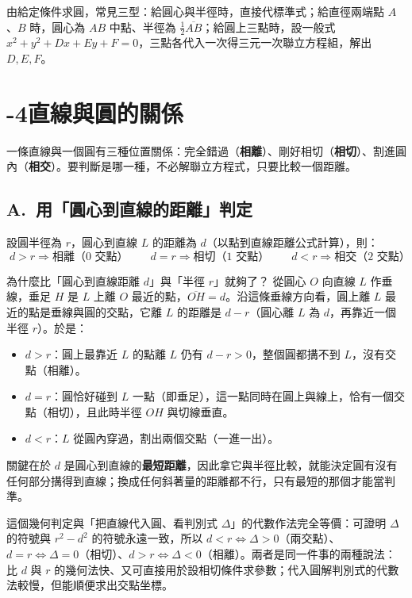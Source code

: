 \documentclass[11pt]{article}
\begin{document}
由給定條件求圓，常見三型：給圓心與半徑時，直接代標準式；給直徑兩端點 $A$、$B$ 時，圓心為 $AB$ 中點、半徑為 $\tfrac12\overline{AB}$；給圓上三點時，設一般式 $x^2+y^2+Dx+Ey+F=0$，三點各代入一次得三元一次聯立方程組，解出 $D,E,F$。

\section*{-4\quad 直線與圓的關係}

一條直線與一個圓有三種位置關係：完全錯過（\textbf{相離}）、剛好相切（\textbf{相切}）、割進圓內（\textbf{相交}）。要判斷是哪一種，不必解聯立方程式，只要比較一個距離。

\subsection*{\sffamily A.\ 用「圓心到直線的距離」判定}

設圓半徑為 $r$，圓心到直線 $L$ 的距離為 $d$（以點到直線距離公式計算），則：
$$\boxed{\;d>r\Rightarrow\text{相離（0 交點）}\qquad d=r\Rightarrow\text{相切（1 交點）}\qquad d<r\Rightarrow\text{相交（2 交點）}\;}$$


\begin{補充框}{為什麼比「圓心到直線距離 $d$」與「半徑 $r$」就夠了？}
從圓心 $O$ 向直線 $L$ 作垂線，垂足 $H$ 是 $L$ 上離 $O$ 最近的點，$\overline{OH}=d$。沿這條垂線方向看，圓上離 $L$ 最近的點是垂線與圓的交點，它離 $L$ 的距離是 $d-r$（圓心離 $L$ 為 $d$，再靠近一個半徑 $r$）。於是：
\begin{itemize}\setlength{\itemsep}{1pt}
\item $d>r$：圓上最靠近 $L$ 的點離 $L$ 仍有 $d-r>0$，整個圓都搆不到 $L$，沒有交點（相離）。
\item $d=r$：圓恰好碰到 $L$ 一點（即垂足），這一點同時在圓上與線上，恰有一個交點（相切），且此時半徑 $OH$ 與切線垂直。
\item $d<r$：$L$ 從圓內穿過，割出兩個交點（一進一出）。
\end{itemize}
關鍵在於 $d$ 是圓心到直線的\textbf{最短距離}，因此拿它與半徑比較，就能決定圓有沒有任何部分搆得到直線；換成任何斜著量的距離都不行，只有最短的那個才能當判準。

這個幾何判定與「把直線代入圓、看判別式 $\Delta$」的代數作法完全等價：可證明 $\Delta$ 的符號與 $r^2-d^2$ 的符號永遠一致，所以 $d<r\Leftrightarrow\Delta>0$（兩交點）、$d=r\Leftrightarrow\Delta=0$（相切）、$d>r\Leftrightarrow\Delta<0$（相離）。兩者是同一件事的兩種說法：比 $d$ 與 $r$ 的幾何法快、又可直接用於設相切條件求參數；代入圓解判別式的代數法較慢，但能順便求出交點坐標。
\end{補充框}
\end{document}
